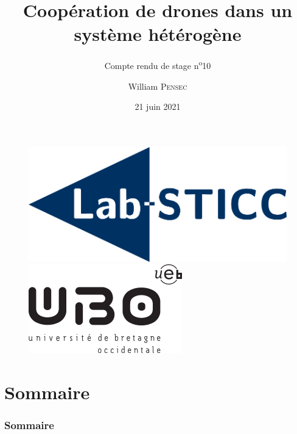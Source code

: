 \documentclass[12pt]{beamer}
\title[Compte rendu de stage n\textsuperscript{o}10]{Coopération de drones dans un système hétérogène}
\subtitle{Compte rendu de stage n\textsuperscript{o}10}
\author{William \textsc{Pensec}}
\institute[Lab-STICC]{Lab-Sticc}
\date{21 juin 2021}
\begin{document}
	\begin{frame}
		\begin{titlepage}
			\begin{figure}[H]
				\centering
				\includegraphics[scale=.15]{labsticc.png}
				\hspace{3cm}
				\includegraphics[scale=.3]{ubo.png}
			\end{figure}
		\end{titlepage}
	\end{frame}
	
	\section*{Sommaire}
	\begin{frame}
		\frametitle{Sommaire}
		\begin{center}
			\tableofcontents
		\end{center}
	\end{frame}
\end{document}
